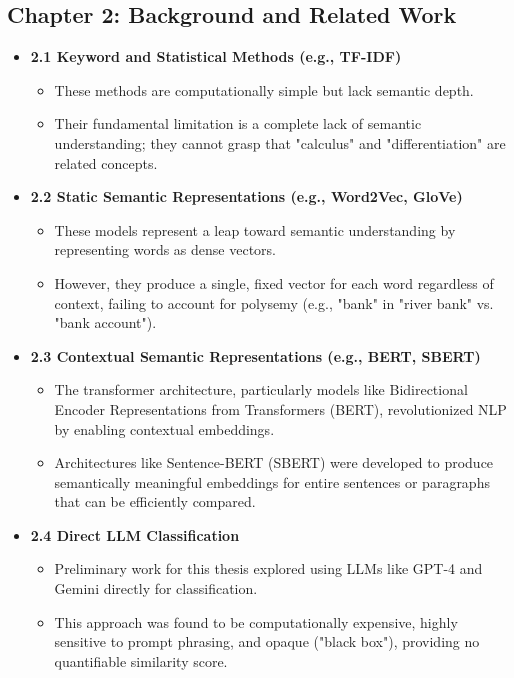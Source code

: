 \documentclass[11pt]{article}
\begin{document}
\subsection*{Chapter 2: Background and Related Work}
\begin{itemize}
    \item \textbf{2.1 Keyword and Statistical Methods (e.g., TF-IDF)}
    \begin{itemize}
        \item These methods are computationally simple but lack semantic depth.
        \item Their fundamental limitation is a complete lack of semantic understanding; they cannot grasp that "calculus" and "differentiation" are related concepts.
    \end{itemize}
    \item \textbf{2.2 Static Semantic Representations (e.g., Word2Vec, GloVe)}
    \begin{itemize}
        \item These models represent a leap toward semantic understanding by representing words as dense vectors.
        \item However, they produce a single, fixed vector for each word regardless of context, failing to account for polysemy (e.g., "bank" in "river bank" vs. "bank account").
    \end{itemize}
    \item \textbf{2.3 Contextual Semantic Representations (e.g., BERT, SBERT)}
    \begin{itemize}
        \item The transformer architecture, particularly models like Bidirectional Encoder Representations from Transformers (BERT), revolutionized NLP by enabling contextual embeddings.
        \item Architectures like Sentence-BERT (SBERT) were developed to produce semantically meaningful embeddings for entire sentences or paragraphs that can be efficiently compared.
    \end{itemize}
    \item \textbf{2.4 Direct LLM Classification}
    \begin{itemize}
        \item Preliminary work for this thesis explored using LLMs like GPT-4 and Gemini directly for classification.
        \item This approach was found to be computationally expensive, highly sensitive to prompt phrasing, and opaque ("black box"), providing no quantifiable similarity score.

\end{itemize}
\end{itemize}
\end{document}
